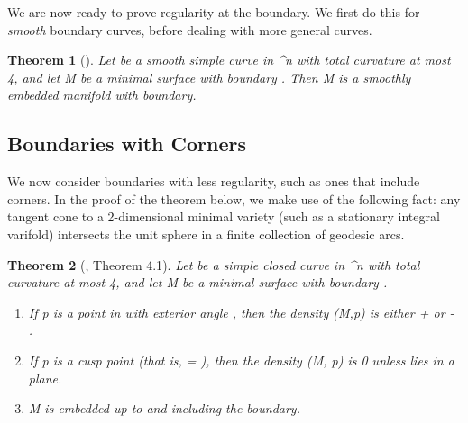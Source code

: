 \documentclass[a4paper, 11pt]{article}
\theoremstyle{plain}
\newtheorem{theorem}{Theorem}[section]
\theoremstyle{definition}
\theoremstyle{remark}
\numberwithin{equation}{subsection}
\def\({}
\def\){}
\def\pi{}
\begin{document}
We are now ready to prove regularity at the boundary. We first do this for \emph{smooth} boundary curves, before dealing with more general curves.

\begin{theorem}[{\cite[Theorem 3.2]{EWW02}}]
Let \(\Gamma\) be a smooth simple curve in \(^{n}\) with total curvature at most \(4\pi\), and let \(M\) be a minimal surface with boundary \(\Gamma\). Then \(M\) is a smoothly embedded manifold with boundary.
\end{theorem}

\begin{comment}  
\begin{proof}
We know from \cref{Interior_Regularity_3} that the interior of \(M\) is smoothly embedded. Now pick a point \(p \in \Gamma\). As in the proof of  \cref{Interior_Regularity_3}, we may assume a strict inequality in \ \cref{Interior_regularity_basic_estimate}. Then by Theorems \ref{Interior_regularity_basic_estimate} and \ref{Boundary_Regularity_1}, we have that
\begin{equation}
\Theta(M,p) < \operatorname{Cone}((\Gamma, p), p) \leqslant \frac{1}{2\pi}\operatorname{TotalCurvature}(\Gamma) - \frac{1}{2} \leqslant \frac{4\pi}{2\pi} - \frac{1}{2} = \frac{3}{2}.
\end{equation}
But any boundary branch point has density at least \(3/2\), and similarly for any point at which \(M\) is not embedded.
\end{proof}
\end{comment}


\subsection{Boundaries with Corners}

We now consider boundaries with less regularity, such as ones that include corners. In the proof of the theorem below, we make use of the following fact: any tangent cone to a \(2\)-dimensional minimal variety (such as a stationary integral varifold) intersects the unit sphere in a finite collection of geodesic arcs.

\begin{theorem}[{\cite{EWW02}, Theorem 4.1}]
\label{Boundary_Corners}
Let \(\Gamma\) be a simple closed curve in \(^{n}\) with total curvature at most \(4\pi\), and let \(M\) be a minimal surface with boundary \(\Gamma\).

\begin{enumerate}
\item[(i)] If \(p\) is a point in \(\Gamma\) with exterior angle \(\theta\), then the density \(\Theta(M,p)\) is either \( + \frac{\theta}{2\pi}\) or  \( - \frac{\theta}{2\pi}\).
\item[(ii)] If \(p\) is a cusp point (that is, \(\theta = \pi\)), then the density \(\Theta(M, p)\) is  \(0\) unless \(\Gamma\) lies in a plane.
\item[(iii)] \(M\) is embedded up to and including the boundary.
\end{enumerate}
\end{theorem}
\end{document}
